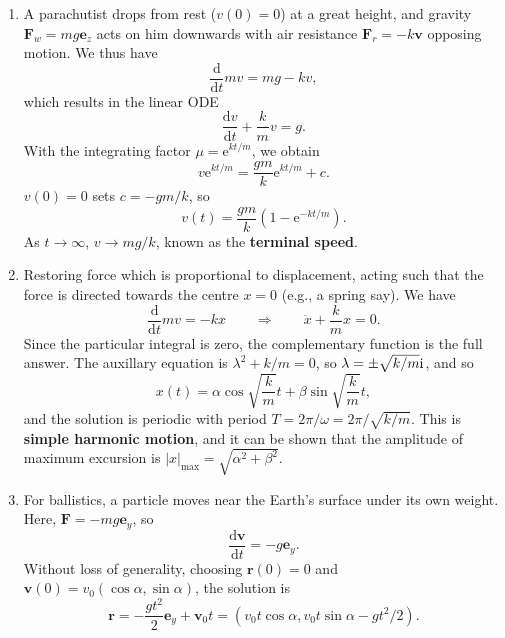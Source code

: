 \documentclass[letter-paper]{tufte-book}
\newcommand{\eb}{\boldsymbol{e}}
\newcommand{\Fb}{\boldsymbol{F}}
\newcommand{\rb}{\boldsymbol{r}}
\newcommand{\vb}{\boldsymbol{v}}
\newcommand{\ex}{\mathrm{e}}
\newcommand{\zi}{{\rm i}}
\newcommand\Def[1]{\textbf{#1}}
\begin{document}
\begin{enumerate}
  \item A parachutist drops from rest ($v(0) = 0$) at a great height, and
  gravity $\Fb_w = mg\eb_z$ acts on him downwards with air resistance $\Fb_r =
  -k\vb$ opposing motion. We thus have
  \begin{equation*}
    \frac{\mathrm{d}}{\mathrm{d}t} mv = mg - kv,
  \end{equation*}
  which results in the linear ODE
  \begin{equation*}
    \frac{\mathrm{d}v}{\mathrm{d}t} + \frac{k}{m}v = g.
  \end{equation*}
  With the integrating factor $\mu = \ex^{kt/m}$, we obtain
  \begin{equation*}
    v\ex^{kt/m} = \frac{gm}{k}\ex^{kt/m} + c.
  \end{equation*}
  $v(0) = 0$ sets $c = -gm/k$, so
  \begin{equation*}
    v(t) = \frac{gm}{k}\left(1 - \ex^{-kt/m}\right).
  \end{equation*}
  As $t\to\infty$, $v\to mg/k$, known as the \Def{terminal speed}.
  
  
  \item Restoring force which is proportional to displacement, acting such that
  the force is directed towards the centre $x=0$ (e.g., a spring say). We have
  \begin{equation*}
    \frac{\mathrm{d}}{\mathrm{d}t} mv = -kx \qquad\Rightarrow\qquad
    \ddot{x} + \frac{k}{m}x = 0.
  \end{equation*}
  Since the particular integral is zero, the complementary function is the full
  answer. The auxillary equation is $\lambda^2 + k/m = 0$, so $\lambda =
  \pm\sqrt{k/m}\zi$, and so
  \begin{equation*}
    x(t) = \alpha\cos\sqrt{\frac{k}{m}}t + \beta\sin\sqrt{\frac{k}{m}}t,
  \end{equation*}
  and the solution is periodic with period $T = 2\pi/\omega = 2\pi/\sqrt{k/m}$.
  This is \Def{simple harmonic motion}, and it can be shown that the
  amplitude of maximum excursion is $|x|_{\max} = \sqrt{\alpha^2 + \beta^2}$.

  \item For ballistics, a particle moves near the Earth's surface under its own
  weight. Here, $\Fb = -mg\eb_y$, so
  \begin{equation*}
    \frac{\mathrm{d}\vb}{\mathrm{d}t} = -g\eb_y.
  \end{equation*}
  Without loss of generality, choosing $\rb(0) = 0$ and $\vb(0) = v_0
  (\cos\alpha, \sin\alpha)$, the solution is
  \begin{equation*}
    \rb = -\frac{gt^2}{2}\eb_y + \vb_0 t 
    = (v_0 t \cos\alpha, v_0 t \sin\alpha - gt^2/2).
  \end{equation*}
  

\end{enumerate}
\end{document}
